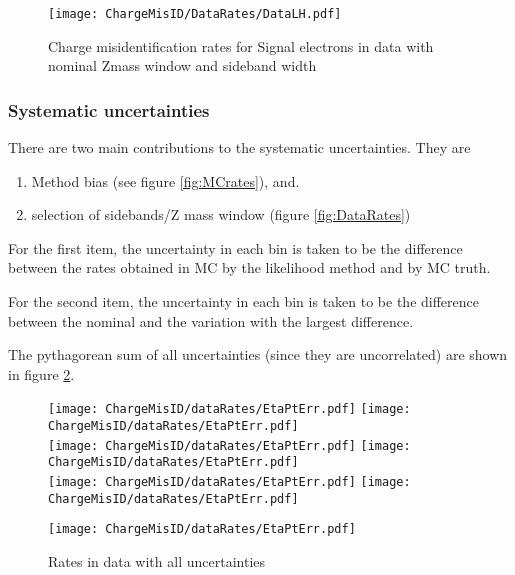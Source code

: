 \begin{figure}[h]
\centering
\texttt{[image: ChargeMisID/DataRates/DataLH.pdf]}{}
\caption{Charge misidentification rates for Signal electrons in data with nominal Zmass window and sideband width}
\label{fig:DataRates2D}
\end{figure}

\FloatBarrier

\subsubsection*{Systematic uncertainties}

There are two main contributions to the systematic uncertainties. They are

\begin{enumerate}
\item Method bias (see figure \ref{fig:MCrates}), and.
\item selection of sidebands/Z mass window (figure \ref{fig:DataRates})
\end{enumerate}

For the first item, the uncertainty in each bin is taken to be the difference between the rates obtained in MC by the likelihood method and by MC truth. 

For the second item, the uncertainty in each bin is taken to be the difference between the nominal and the variation with the largest difference. 

The pythagorean sum of all uncertainties (since they are uncorrelated) are shown in figure \ref{fig:DataRatesWErr}.

\begin{figure}[h]
\centering
\texttt{[image: ChargeMisID/dataRates/EtaPtErr.pdf]}
\texttt{[image: ChargeMisID/dataRates/EtaPtErr.pdf]}\\
\texttt{[image: ChargeMisID/dataRates/EtaPtErr.pdf]}
\texttt{[image: ChargeMisID/dataRates/EtaPtErr.pdf]}\\
\texttt{[image: ChargeMisID/dataRates/EtaPtErr.pdf]}
\texttt{[image: ChargeMisID/dataRates/EtaPtErr.pdf]}
\end{figure}

\begin{figure}[h]
\ContinuedFloat
\centering
\texttt{[image: ChargeMisID/dataRates/EtaPtErr.pdf]}
\caption{Rates in data with all uncertainties}
\label{fig:DataRatesWErr}
\end{figure}

\FloatBarrier
